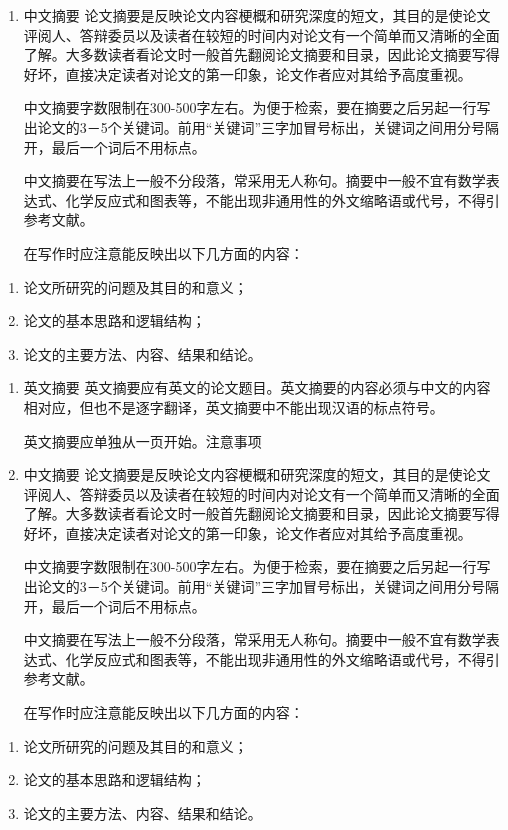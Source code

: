 \documentclass{cupb-thesis}
\begin{document}
\begin{enumerate}[label=\arabic*.]
  \item 中文摘要
论文摘要是反映论文内容梗概和研究深度的短文，其目的是使论文评阅人、答辩委员以及读者在较短的时间内对论文有一个简单而又清晰的全面了解。大多数读者看论文时一般首先翻阅论文摘要和目录，因此论文摘要写得好坏，直接决定读者对论文的第一印象，论文作者应对其给予高度重视。

中文摘要字数限制在300-500字左右。为便于检索，要在摘要之后另起一行写出论文的3－5个关键词。前用“关键词”三字加冒号标出，关键词之间用分号隔开，最后一个词后不用标点。

中文摘要在写法上一般不分段落，常采用无人称句。摘要中一般不宜有数学表达式、化学反应式和图表等，不能出现非通用性的外文缩略语或代号，不得引参考文献。

在写作时应注意能反映出以下几方面的内容：

\end{enumerate}
\begin{enumerate}[label=（\arabic*）]
  \item 论文所研究的问题及其目的和意义；
  \item 论文的基本思路和逻辑结构；
  \item 论文的主要方法、内容、结果和结论。
\end{enumerate}
\begin{enumerate}[label=\arabic*.]
  \item 英文摘要
英文摘要应有英文的论文题目。英文摘要的内容必须与中文的内容相对应，但也不是逐字翻译，英文摘要中不能出现汉语的标点符号。

英文摘要应单独从一页开始。注意事项

  \item 中文摘要
论文摘要是反映论文内容梗概和研究深度的短文，其目的是使论文评阅人、答辩委员以及读者在较短的时间内对论文有一个简单而又清晰的全面了解。大多数读者看论文时一般首先翻阅论文摘要和目录，因此论文摘要写得好坏，直接决定读者对论文的第一印象，论文作者应对其给予高度重视。

中文摘要字数限制在300-500字左右。为便于检索，要在摘要之后另起一行写出论文的3－5个关键词。前用“关键词”三字加冒号标出，关键词之间用分号隔开，最后一个词后不用标点。

中文摘要在写法上一般不分段落，常采用无人称句。摘要中一般不宜有数学表达式、化学反应式和图表等，不能出现非通用性的外文缩略语或代号，不得引参考文献。

在写作时应注意能反映出以下几方面的内容：

\end{enumerate}
\begin{enumerate}[label=（\arabic*）]
  \item 论文所研究的问题及其目的和意义；
  \item 论文的基本思路和逻辑结构；
  \item 论文的主要方法、内容、结果和结论。
\end{enumerate}
\end{document}
